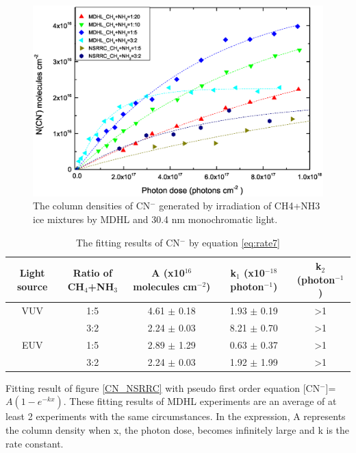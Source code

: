 \begin{figure}
\centering
\includegraphics[width=\textwidth]{figures/chapter3/overall_CN_NSRRC.eps}
\caption{The column densities of CN$^-$ generated by irradiation of CH4+NH3 ice mixtures by MDHL and 30.4 nm monochromatic light.}
\label{fig:CN_NSRRC}
\end{figure}

\begin{table}[htbp]
\caption{The fitting results of CN$^-$ by equation \ref{eq:rate7}}
\label{tab:CNrate}
\begin{tabular}{ccccc}
\hline
\hline
Light source & Ratio of CH$_4$+NH$_3$ & A (x10$^{16}$ molecules cm$^{-2}$) & k$_1$ (x10$^{-18}$ photon$^{-1}$) & k$_2$ (photon$^{-1}$)\\
\hline
VUV & 1:5 & 4.61 $\pm$ 0.18 & 1.93 $\pm$ 0.19 & >1 \\
 & 3:2 & 2.24 $\pm$ 0.03 & 8.21 $\pm$ 0.70 & >1 \\
\hline
EUV & 1:5 & 2.89 $\pm$ 1.29 & 0.63 $\pm$ 0.37 & >1 \\
 & 3:2 & 2.24 $\pm$ 0.03 & 1.92 $\pm$ 1.99 & >1 \\
\hline
\end{tabular}
Fitting result of figure \ref{CN_NSRRC} with pseudo first order equation [CN$^-$]=$A(1-e^{-kx})$. These fitting results of MDHL experiments are an average of at least 2 experiments with the same circumstances. In the expression, A represents the column density when x, the photon dose, becomes infinitely large and k is the rate constant.\
\end{table}


